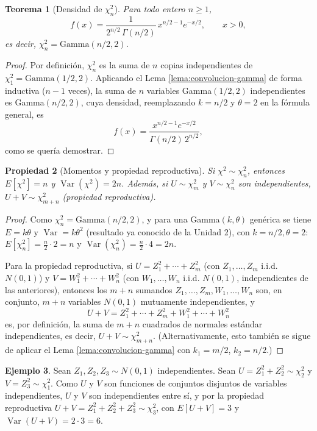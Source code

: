 \documentclass[11pt,a4paper]{article}
\theoremstyle{plain}
\newtheorem{teorema}{Teorema}[section]
\newtheorem{propiedad}[teorema]{Propiedad}
\theoremstyle{definition}
\newtheorem{ejemplo}[teorema]{Ejemplo}
\theoremstyle{remark}
\begin{document}
\begin{teorema}[Densidad de $\chi_n^2$]\label{teo:densidad-chi}
Para todo entero $n\ge1$,
\[
f(x) = \frac{1}{2^{n/2}\,\Gamma(n/2)}\,x^{n/2-1}e^{-x/2}, \qquad x>0,
\]
es decir, $\chi_n^2 = \text{Gamma}(n/2,2)$.
\end{teorema}

\begin{proof}
Por definición, $\chi_n^2$ es la suma de $n$ copias independientes de $\chi_1^2=\text{Gamma}(1/2,2)$. Aplicando el Lema \ref{lema:convolucion-gamma} de forma inductiva ($n-1$ veces), la suma de $n$ variables Gamma$(1/2,2)$ independientes es Gamma$(n/2,2)$, cuya densidad, reemplazando $k=n/2$ y $\theta=2$ en la fórmula general, es
\[
f(x) = \frac{x^{n/2-1}e^{-x/2}}{\Gamma(n/2)\,2^{n/2}},
\]
como se quería demostrar.
\end{proof}

\begin{propiedad}[Momentos y propiedad reproductiva]\label{prop:chi-momentos}
Si $\chi^2\sim\chi_n^2$, entonces $E[\chi^2]=n$ y $\operatorname{Var}(\chi^2)=2n$. Además, si $U\sim\chi_m^2$ y $V\sim\chi_n^2$ son independientes, $U+V\sim\chi_{m+n}^2$ (propiedad reproductiva).
\end{propiedad}

\begin{proof}
Como $\chi_n^2=\text{Gamma}(n/2,2)$, y para una Gamma$(k,\theta)$ genérica se tiene $E=k\theta$ y $\operatorname{Var}=k\theta^2$ (resultado ya conocido de la Unidad 2), con $k=n/2,\theta=2$: $E[\chi_n^2] = \tfrac{n}{2}\cdot2=n$ y $\operatorname{Var}(\chi_n^2)=\tfrac{n}{2}\cdot4=2n$.

Para la propiedad reproductiva, si $U=Z_1^2+\cdots+Z_m^2$ (con $Z_1,\dots,Z_m$ i.i.d. $N(0,1)$) y $V=W_1^2+\cdots+W_n^2$ (con $W_1,\dots,W_n$ i.i.d. $N(0,1)$, independientes de las anteriores), entonces los $m+n$ sumandos $Z_1,\dots,Z_m,W_1,\dots,W_n$ son, en conjunto, $m+n$ variables $N(0,1)$ mutuamente independientes, y
\[
U+V = Z_1^2+\cdots+Z_m^2+W_1^2+\cdots+W_n^2
\]
es, por definición, la suma de $m+n$ cuadrados de normales estándar independientes, es decir, $U+V\sim\chi_{m+n}^2$. (Alternativamente, esto también se sigue de aplicar el Lema \ref{lema:convolucion-gamma} con $k_1=m/2$, $k_2=n/2$.)
\end{proof}

\begin{ejemplo}
Sean $Z_1,Z_2,Z_3\sim N(0,1)$ independientes. Sean $U=Z_1^2+Z_2^2\sim\chi_2^2$ y $V=Z_3^2\sim\chi_1^2$. Como $U$ y $V$ son funciones de conjuntos disjuntos de variables independientes, $U$ y $V$ son independientes entre sí, y por la propiedad reproductiva $U+V=Z_1^2+Z_2^2+Z_3^2\sim\chi_3^2$, con $E[U+V]=3$ y $\operatorname{Var}(U+V)=2\cdot3=6$.
\end{ejemplo}
\end{document}

